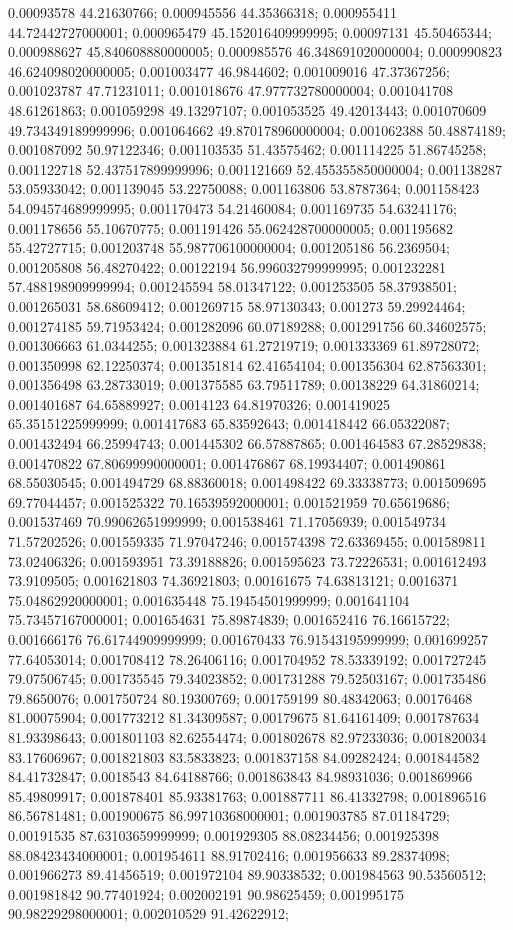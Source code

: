 0.00093578 44.21630766; 0.000945556 44.35366318; 0.000955411 44.72442727000001; 0.000965479 45.152016409999995; 0.00097131 45.50465344; 0.000988627 45.840608880000005; 0.000985576 46.348691020000004; 0.000990823 46.624098020000005; 0.001003477 46.9844602; 0.001009016 47.37367256; 0.001023787 47.71231011; 0.001018676 47.977732780000004; 0.001041708 48.61261863; 0.001059298 49.13297107; 0.001053525 49.42013443; 0.001070609 49.734349189999996; 0.001064662 49.870178960000004; 0.001062388 50.48874189; 0.001087092 50.97122346; 0.001103535 51.43575462; 0.001114225 51.86745258; 0.001122718 52.437517899999996; 0.001121669 52.455355850000004; 0.001138287 53.05933042; 0.001139045 53.22750088; 0.001163806 53.8787364; 0.001158423 54.094574689999995; 0.001170473 54.21460084; 0.001169735 54.63241176; 0.001178656 55.10670775; 0.001191426 55.062428700000005; 0.001195682 55.42727715; 0.001203748 55.987706100000004; 0.001205186 56.2369504; 0.001205808 56.48270422; 0.00122194 56.996032799999995; 0.001232281 57.488198909999994; 0.001245594 58.01347122; 0.001253505 58.37938501; 0.001265031 58.68609412; 0.001269715 58.97130343; 0.001273 59.29924464; 0.001274185 59.71953424; 0.001282096 60.07189288; 0.001291756 60.34602575; 0.001306663 61.0344255; 0.001323884 61.27219719; 0.001333369 61.89728072; 0.001350998 62.12250374; 0.001351814 62.41654104; 0.001356304 62.87563301; 0.001356498 63.28733019; 0.001375585 63.79511789; 0.00138229 64.31860214; 0.001401687 64.65889927; 0.0014123 64.81970326; 0.001419025 65.35151225999999; 0.001417683 65.83592643; 0.001418442 66.05322087; 0.001432494 66.25994743; 0.001445302 66.57887865; 0.001464583 67.28529838; 0.001470822 67.80699990000001; 0.001476867 68.19934407; 0.001490861 68.55030545; 0.001494729 68.88360018; 0.001498422 69.33338773; 0.001509695 69.77044457; 0.001525322 70.16539592000001; 0.001521959 70.65619686; 0.001537469 70.99062651999999; 0.001538461 71.17056939; 0.001549734 71.57202526; 0.001559335 71.97047246; 0.001574398 72.63369455; 0.001589811 73.02406326; 0.001593951 73.39188826; 0.001595623 73.72226531; 0.001612493 73.9109505; 0.001621803 74.36921803; 0.00161675 74.63813121; 0.0016371 75.04862920000001; 0.001635448 75.19454501999999; 0.001641104 75.73457167000001; 0.001654631 75.89874839; 0.001652416 76.16615722; 0.001666176 76.61744909999999; 0.001670433 76.91543195999999; 0.001699257 77.64053014; 0.001708412 78.26406116; 0.001704952 78.53339192; 0.001727245 79.07506745; 0.001735545 79.34023852; 0.001731288 79.52503167; 0.001735486 79.8650076; 0.001750724 80.19300769; 0.001759199 80.48342063; 0.00176468 81.00075904; 0.001773212 81.34309587; 0.00179675 81.64161409; 0.001787634 81.93398643; 0.001801103 82.62554474; 0.001802678 82.97233036; 0.001820034 83.17606967; 0.001821803 83.5833823; 0.001837158 84.09282424; 0.001844582 84.41732847; 0.0018543 84.64188766; 0.001863843 84.98931036; 0.001869966 85.49809917; 0.001878401 85.93381763; 0.001887711 86.41332798; 0.001896516 86.56781481; 0.001900675 86.99710368000001; 0.001903785 87.01184729; 0.00191535 87.63103659999999; 0.001929305 88.08234456; 0.001925398 88.08423434000001; 0.001954611 88.91702416; 0.001956633 89.28374098; 0.001966273 89.41456519; 0.001972104 89.90338532; 0.001984563 90.53560512; 0.001981842 90.77401924; 0.002002191 90.98625459; 0.001995175 90.98229298000001; 0.002010529 91.42622912; 